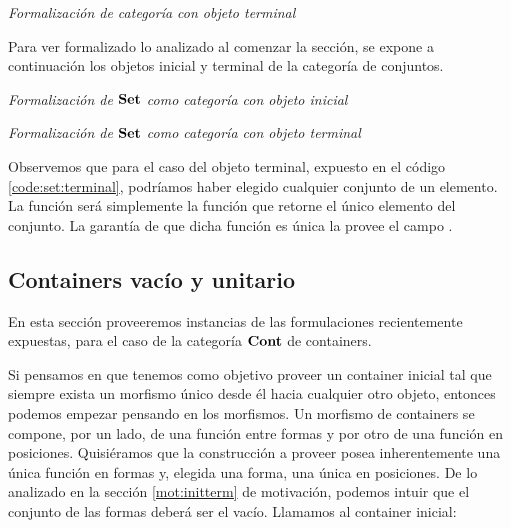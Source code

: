 \begin{agdacode}{\it Formalización de categoría con objeto terminal}\hspace{3ex}\label{code:cat:terminal}
  
\end{agdacode}

Para ver formalizado lo analizado al comenzar la sección, se expone a continuación los objetos inicial y terminal de la categoría de conjuntos.


\begin{agdacode}{\it Formalización de $\mathbf{Set}$ como categoría con objeto inicial}\hspace{3ex}\label{code:set:initial}
  
\end{agdacode}

\begin{agdacode}{\it Formalización de $\mathbf{Set}$ como categoría con objeto terminal}\hspace{3ex}\label{code:set:terminal}
  
\end{agdacode}

Observemos que para el caso del objeto terminal, expuesto en el código \ref{code:set:terminal}, podríamos haber elegido cualquier conjunto de un elemento. La función  será simplemente la función que retorne el único elemento del conjunto. La garantía de que dicha función es única la provee el campo .


\subsection{Containers vacío y unitario}



En esta sección proveeremos instancias de las formulaciones recientemente expuestas, para el caso de la categoría $\mathbf{Cont}$ de containers.

Si pensamos en que tenemos como objetivo proveer un container inicial tal que siempre exista un morfismo único desde él hacia cualquier otro objeto, entonces podemos empezar pensando en los morfismos. Un morfismo de containers se compone, por un lado, de una función entre formas y por otro de una función en posiciones. Quisiéramos que la construcción a proveer posea inherentemente una única función en formas y, elegida una forma, una única en posiciones. De lo analizado en la sección \ref{mot:initterm} de motivación, podemos intuir que el conjunto de las formas deberá ser el vacío. Llamamos  al container inicial:

